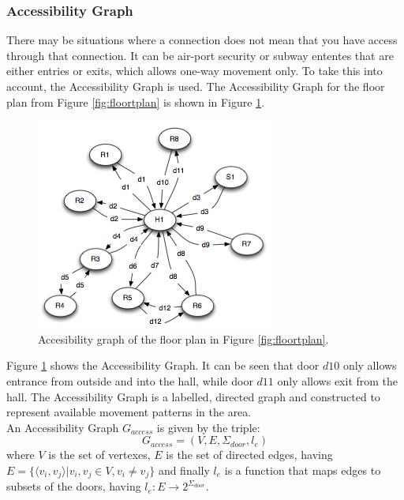 \subsubsection{ \qquad Accessibility Graph}
There may be situations where a connection does not mean that you have access through that connection.
It can be air-port security or subway ententes that are either entries or exits, which allows one-way movement only.
To take this into account, the Accessibility Graph is used. 
The Accessibility Graph for the floor plan from Figure \ref{fig:floortplan} is shown in Figure \ref{fig:accesibbilitygraph}.
\begin{figure}[]%
\centering
\includegraphics[width=0.8\columnwidth]{images/accessibilitygraph.png}%
\caption{Accesibility graph of the floor plan in Figure \ref{fig:floortplan}.} %
\label{fig:accesibbilitygraph}%
\end{figure}%
Figure \ref{fig:accesibbilitygraph} shows the Accessibility Graph.
It can be seen that door $d10$ only allows entrance from outside and into the hall, while door $d11$ only allows exit from the hall.
The Accessibility Graph is a labelled, directed graph and constructed to represent available movement patterns in the area. \\
An Accessibility Graph $G_{access}$ is given by the triple: 
\begin{equation}
G_{access} = (V, E, \Sigma_{door}, l_e)
\end{equation} 
where $V$ is the set of vertexes, $E$ is the set of directed edges, having $E = \{\langle v_i, v_j \rangle | v_i, v_j \in V,  v_i \not= v_j\}$ and finally $l_e$ is a function that maps edges to subsets of the doors, having $l_e : E \rightarrow 2^{\Sigma_{door}}$. \\

